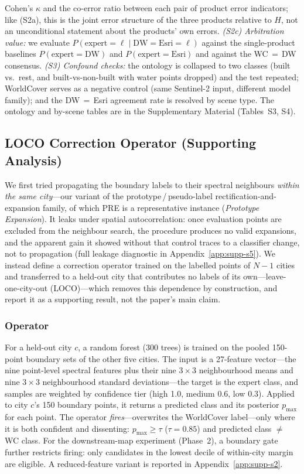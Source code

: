 \documentclass[remotesensing,article,submit,moreauthors]{Definitions/mdpi}
\begin{document}
Cohen's $\kappa$ and the co-error ratio between each pair of product error
indicators; like (S2a), this is the joint error structure of the three
products relative to $H$, not an unconditional statement about the products'
own errors. \emph{(S2c) Arbitration value:} we evaluate $P(\text{expert} = \ell \mid
\text{DW} = \text{Esri} = \ell)$ against the single-product baselines
$P(\text{expert} = \text{DW})$ and $P(\text{expert} = \text{Esri})$ and against
the WC\,$=$\,DW consensus. \emph{(S3) Confound checks:} the ontology is
collapsed to two classes (built vs.\ rest, and built-vs-non-built with water
points dropped) and the test repeated; WorldCover serves as a negative control
(same Sentinel-2 input, different model family); and the DW\,$=$\,Esri
agreement rate is resolved by scene type. The ontology and by-scene tables are
in the Supplementary Material (Tables~S3, S4).

\subsection{LOCO Correction Operator (Supporting Analysis)}\label{sec:loco}

We first tried propagating the boundary labels to their spectral neighbours
\emph{within the same city}---our variant of the prototype\,/\,pseudo-label
rectification-and-expansion family, of which PRE \citep{tong2024pre} is a
representative instance (\emph{Prototype Expansion}). It leaks under spatial
autocorrelation: once evaluation points are excluded from the neighbour
search, the procedure produces no valid expansions, and the apparent gain it
showed without that control traces to a classifier change, not to propagation
(full leakage diagnostic in Appendix~\ref{app:supp-s5}). We instead define a correction
operator trained on the labelled points of $N - 1$ cities and transferred to a
held-out city that contributes no labels of its own---leave-one-city-out
(LOCO)---which removes this dependence by construction, and report it as a
supporting result, not the paper's main claim.

\subsubsection*{Operator}

For a held-out city $c$, a random forest (300 trees) is trained on the pooled
150-point boundary sets of the other five cities. The input is a 27-feature
vector---the nine point-level spectral features plus their nine $3 \times 3$
neighbourhood means and nine $3 \times 3$ neighbourhood standard
deviations---the target is the expert class, and samples are weighted by
confidence tier (high 1.0, medium 0.6, low 0.3). Applied to city $c$'s 150
boundary points, it returns a predicted class and its posterior $p_{\max}$ for
each point. The operator \emph{fires}---overwrites the WorldCover label---only
where it is both confident and dissenting: $p_{\max} \ge \tau$ ($\tau = 0.85$)
and predicted class $\neq$ WC class. For the downstream-map experiment
(Phase~2), a boundary gate further restricts firing: only candidates in the
lowest decile of within-city margin are eligible. A reduced-feature variant is
reported in Appendix~\ref{app:supp-s2}.
\end{document}

